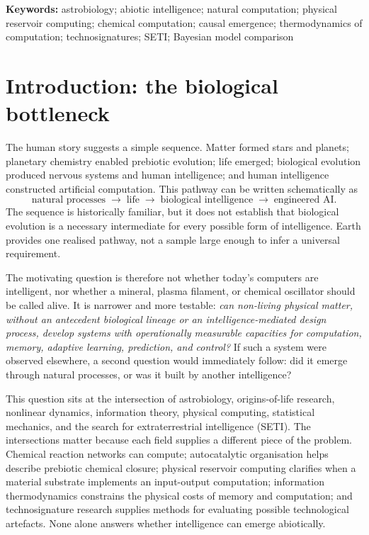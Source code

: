 \documentclass[11pt]{article}
\begin{document}
\textbf{Keywords:} astrobiology; abiotic intelligence; natural computation; physical reservoir computing; chemical computation; causal emergence; thermodynamics of computation; technosignatures; SETI; Bayesian model comparison

\section{Introduction: the biological bottleneck}

The human story suggests a simple sequence. Matter formed stars and planets; planetary chemistry enabled prebiotic evolution; life emerged; biological evolution produced nervous systems and human intelligence; and human intelligence constructed artificial computation. This pathway can be written schematically as
\begin{equation}
  \text{natural processes}\;\longrightarrow\;\text{life}\;\longrightarrow\;
  \text{biological intelligence}\;\longrightarrow\;\text{engineered AI}.
  \label{eq:earthpath}
\end{equation}
The sequence is historically familiar, but it does not establish that biological evolution is a necessary intermediate for every possible form of intelligence. Earth provides one realised pathway, not a sample large enough to infer a universal requirement.

The motivating question is therefore not whether today's computers are intelligent, nor whether a mineral, plasma filament, or chemical oscillator should be called alive. It is narrower and more testable: \emph{can non-living physical matter, without an antecedent biological lineage or an intelligence-mediated design process, develop systems with operationally measurable capacities for computation, memory, adaptive learning, prediction, and control?} If such a system were observed elsewhere, a second question would immediately follow: did it emerge through natural processes, or was it built by another intelligence?

This question sits at the intersection of astrobiology, origins-of-life research, nonlinear dynamics, information theory, physical computing, statistical mechanics, and the search for extraterrestrial intelligence (SETI). The intersections matter because each field supplies a different piece of the problem. Chemical reaction networks can compute; autocatalytic organisation helps describe prebiotic chemical closure; physical reservoir computing clarifies when a material substrate implements an input-output computation; information thermodynamics constrains the physical costs of memory and computation; and technosignature research supplies methods for evaluating possible technological artefacts. None alone answers whether intelligence can emerge abiotically.
\end{document}
